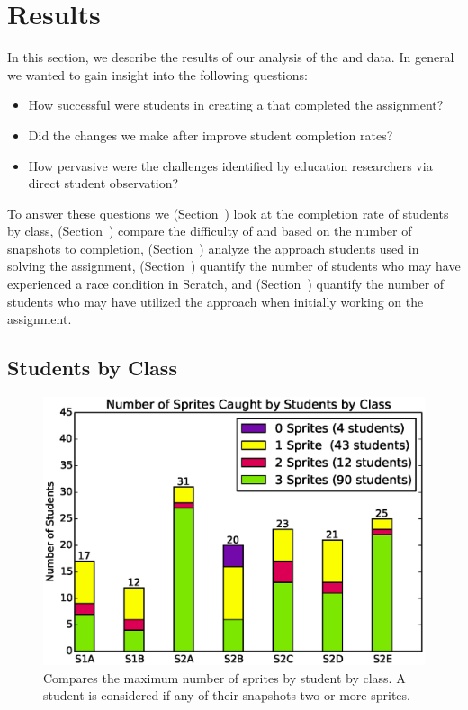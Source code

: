 \section{Results}
In this section, we describe the results of our analysis of the \sone{} and
\stwo{} data. In general we wanted to gain insight into the following
questions:

\begin{itemize}
\item How successful were students in creating a \sprogram{} that completed the
  assignment?
\item Did the changes we make after \sone{} improve student completion rates?
\item How pervasive were the challenges identified by education researchers via
  direct student observation?
\end{itemize}

To answer these questions we (Section~) look at the
completion rate of students by class, (Section~)
compare the difficulty of \sone{} and \stwo{} based on the number of snapshots
to completion, (Section~) analyze the approach students
used in solving the assignment, (Section~) quantify the
number of students who may have experienced a race condition in Scratch, and
(Section~) quantify the number of students who may have
utilized the \dce{} approach when initially working on the assignment.


\subsection{Students by Class}

\begin{figure}[!t]
\centering
\includegraphics[width=5.25in]{graphs/by_class_students.eps}
\caption{Compares the maximum number of sprites \caught{} by student by
  class. A student is considered \com{} if any of their snapshots 
  two or more sprites.}
\end{figure}

